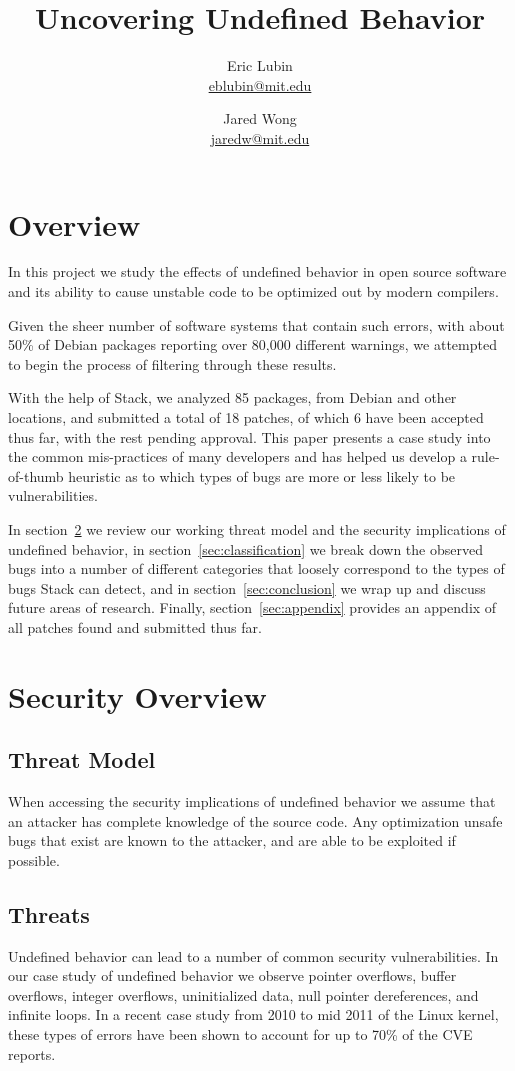 \documentclass[10pt,twocolumn]{article}
\title{Uncovering Undefined Behavior}
\author{
    Eric Lubin\\
    \href{mailto:eblubin@mit.edu}{eblubin@mit.edu}
\and
    Jared Wong\\
    \href{mailto:jaredw@mit.edu}{jaredw@mit.edu}
}
\newcommand{\NumPackages}{85 }
\newcommand{\NumPatches}{18 }
\newcommand{\NumPatchesAccepted}{6 }
\begin{document}
\maketitle

\section{Overview}
In this project we study the effects of undefined behavior in open source software
and its ability to cause unstable code to be optimized out by modern compilers.

Given the sheer number of software systems that contain such errors, 
with about 50\% of Debian packages reporting over 80,000 different warnings,
we attempted to begin the process of filtering through these results. 

With the help of Stack\cite{stack}, we analyzed \NumPackages packages, from
Debian and other locations, and submitted a total of \NumPatches patches, of
which \NumPatchesAccepted have been accepted thus far, with the rest pending
approval. This paper presents a case study into the common mis-practices of
many developers and has helped us develop a rule-of-thumb heuristic as to which
types of bugs are more or less likely to be vulnerabilities.

In section~\ref{sec:security} we review our working threat model and the
security implications of undefined behavior, in
section~\ref{sec:classification} we break down the observed bugs into a number
of different categories that loosely correspond to the types of bugs Stack
can detect, and in section~\ref{sec:conclusion} we wrap up and discuss future
areas of research. Finally, section~\ref{sec:appendix} provides an appendix of
all patches found and submitted thus far.

\section{Security Overview}
\label{sec:security}
\subsection{Threat Model}
When accessing the security implications of undefined behavior we assume that
an attacker has complete knowledge of the source code. Any optimization unsafe
bugs that exist are known to the attacker, and are able to be exploited if
possible.

\subsection{Threats}
Undefined behavior can lead to a number of common security vulnerabilities. In
our case study of undefined behavior we observe pointer overflows, buffer
overflows, integer overflows, uninitialized data, null pointer dereferences,
and infinite loops. In a recent case study from 2010 to mid 2011
\cite{chen-kbugs} of the Linux kernel, these types of errors have been shown to
account for up to 70\% of the CVE reports.
\end{document}
